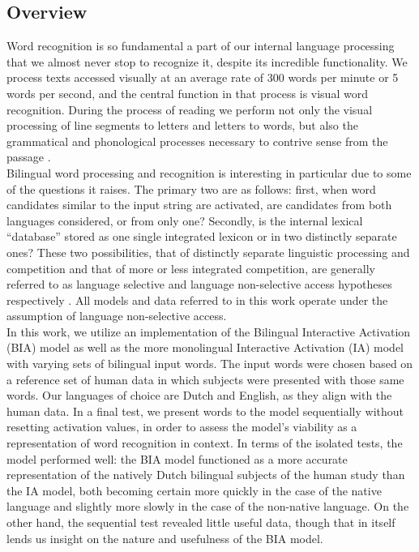 \documentclass[10pt,letterpaper]{article}
\begin{document}
\subsection{Overview}
Word recognition is so fundamental a part of our internal language processing that we almost never stop to recognize it, despite its incredible functionality. We process texts accessed visually at an average rate of 300 words per minute \cite{RaynerPollatsek1989a} or 5 words per second, and the central function in that process is visual word recognition. During the process of reading we perform not only the visual processing of line segments to letters and letters to words, but also the grammatical and phonological processes necessary to contrive sense from the passage \cite{CookBassetti2005a}  .\\
Bilingual word processing and recognition is interesting in particular due to some of the questions it raises. The primary two are as follows: first, when word candidates similar to the input string are activated, are candidates from both languages considered, or from only one? Secondly, is the internal lexical “database” stored as one single integrated lexicon or in two distinctly separate ones? These two possibilities, that of distinctly separate linguistic processing and competition and that of more or less integrated competition, are generally referred to as language selective and language non-selective access hypotheses respectively \cite{DijkstraVanHeuven2002a}. All models and data referred to in this work operate under the assumption of language non-selective access. \\
In this work, we utilize an implementation of the Bilingual Interactive Activation (BIA) model as well as the more monolingual Interactive Activation (IA) model with varying sets of bilingual input words. The input words were chosen based on a reference set of human data in which subjects were presented with those same words. Our languages of choice are Dutch and English, as they align with the human data. In a final test, we present words to the model sequentially without resetting activation values, in order to assess the model’s viability as a representation of word recognition in context. In terms of the isolated tests, the model performed well: the BIA model functioned as a more accurate representation of the natively Dutch bilingual subjects of the human study than the IA model, both becoming certain more quickly in the case of the native language and slightly more slowly in the case of the non-native language. On the other hand, the sequential test revealed little useful data, though that in itself lends us insight on the nature and usefulness of the BIA model. 
\end{document}
